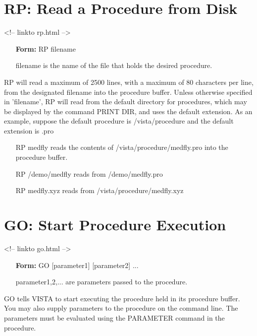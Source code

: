 \section{RP: Read a Procedure from Disk}
\begin{rawhtml}
<!-- linkto rp.html -->
\end{rawhtml}

\begin{itemize}
  \item[\textbf{Form: } RP filename\hfill]{}
  \item[filename]{is the name of the file that holds the desired procedure.}
\end{itemize}

RP will read a maximum of 2500 lines, with a maximum of 80 characters per
line, from the designated filename into the procedure buffer.  Unless
otherwise specified in 'filename', RP will read from the default directory
for procedures, which may be displayed by the command PRINT DIR, and uses
the default extension.  As an example, suppose the default procedure is
/vista/procedure and the default extension is .pro

\begin{itemize}
  \item[RP medfly\hfill]{reads the contents of /vista/procedure/medfly.pro
       into the procedure buffer.}
  \item[RP /demo/medfly\hfill]{reads from /demo/medfly.pro}
  \item[RP medfly.xyz\hfill]{reads from /vista/procedure/medfly.xyz}
\end{itemize}

\section{GO: Start Procedure Execution}
\begin{rawhtml}
<!-- linkto go.html -->
\end{rawhtml}

\begin{itemize}
  \item[\textbf{Form: } GO {[parameter1]} {[parameter2]} ...]{}
  \item[parameter1,2,...]{are parameters passed to the procedure.}
\end{itemize}
GO tells VISTA to start executing the procedure held in its procedure
buffer.  You may also supply parameters to the procedure on the command
line.  The parameters must be evaluated using the PARAMETER command in the
procedure.

